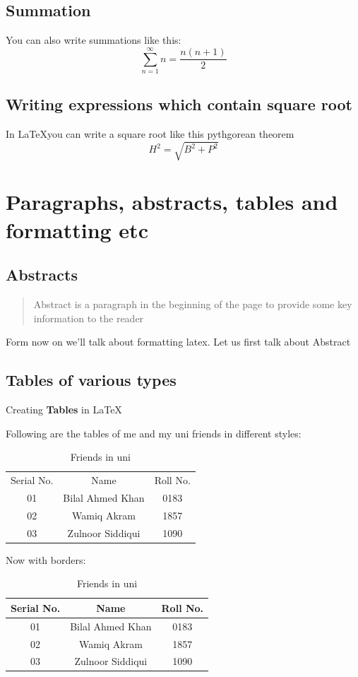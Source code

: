 \documentclass[10pt]{article}
\begin{document}
\subsection{Summation}
You can also write summations like this:
\[\sum_{n=1}^\infty n=\frac{n(n+1)}{2}\]

\subsection{Writing expressions which contain square root}
In \LaTeX you can write a square root like this pythgorean theorem
\begin{equation*}
    H^2=\sqrt{B^2+P^2}
\end{equation*}

\newpage
\section{Paragraphs, abstracts, tables and formatting etc}
\subsection{Abstracts}
\begin{abstract}
    Abstract is a paragraph in the beginning of the page to provide some key information to the reader
\end{abstract}
Form now on we'll talk about formatting latex.
\noindent Let us first talk about Abstract
\subsection{Tables of various types}
Creating \textbf{Tables} in \LaTeX

Following are the tables of me and my uni friends in different styles:
\begin{table}[h!]
\centering
\begin{tabular}{c c c}
     Serial No.& Name & Roll No.  \\
     01 & Bilal Ahmed Khan & 0183 \\
     02 & Wamiq Akram & 1857 \\
     03 & Zulnoor Siddiqui & 1090
\end{tabular}
\caption{Friends in uni}
\end{table}

Now with borders:

\begin{table}[h!]
\centering
\begin{tabular}{|c| c| c|}
    \hline
     Serial No.& Name & Roll No.  \\\hline
     01 & Bilal Ahmed Khan & 0183 \\\hline
     02 & Wamiq Akram & 1857 \\\hline
     03 & Zulnoor Siddiqui & 1090 \\\hline
\end{tabular}
\caption{Friends in uni}
\end{table}
\end{document}
